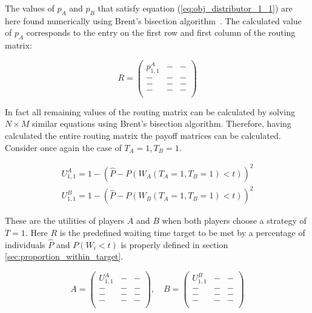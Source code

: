 The values of \(p_A\) and \(p_B\) that satisfy equation 
(\ref{eq:obj_distributor_1_1}) are here found numerically using Brent's bisection
algorithm~\cite{brent1973algorithms}.
The calculated value of \(p_A\) corresponds to the entry on the first row and 
first column of the routing matrix:

\begin{equation}\label{eq:routing_matrix_1_1}
    R = 
    \begin{pmatrix}
        p_{1,1}^A & - & - \\
        - & - & - \\
        - & - & - \\
        - & - & - \\
    \end{pmatrix}
\end{equation}

In fact all remaining values of the routing matrix can be calculated by
solving \(N \times M\) similar equations using Brent's bisection algorithm.
Therefore, having calculated the entire routing matrix the payoff matrices can
be calculated.
Consider once again the case of \(T_A=1, T_B=1\). 


\begin{align}
    U_{1, 1}^A = 1 -\left( 
        \hat{P} - P(W_A(T_A=1, T_B=1) < t) 
    \right)^2 \nonumber
    \\
    U_{1, 1}^B = 1 -\left( 
        \hat{P} - P(W_B(T_A=1, T_B=1) < t) 
    \right)^2 \label{eq:payoff_entry_1_1}
\end{align}

These are the utilities of players \(A\) and \(B\) when both players choose a
strategy of \(T = 1\).
Here \(R\) is the predefined waiting time target to be met by a percentage of 
individuals \( \hat{P} \) and \(P(W_i < t)\) is properly defined in section
\ref{sec:proportion_within_target}.

\begin{equation}\label{eq:payoff_matrices_1_1}
    A = 
    \begin{pmatrix}
        U_{1, 1}^A & - & - \\
        - & - & - \\
        - & - & - \\
        - & - & - \\
    \end{pmatrix}, \quad
    B = 
    \begin{pmatrix}
        U_{1, 1}^B & - & - \\
        - & - & - \\
        - & - & - \\
        - & - & - \\
    \end{pmatrix}
\end{equation}

